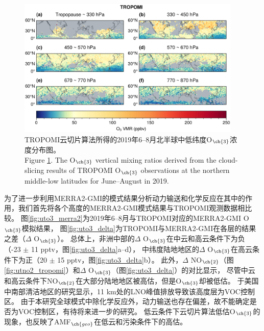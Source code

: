 \begin{figure}[H]
    \centering
    \includegraphics[width=0.95\textwidth]{./figures/uto3_tropomi.png}
    \caption{
    TROPOMI云切片算法所得的2019年6--8月北半球中低纬度O$_{\ch{3}}$浓度分布图。 \\
    Figure \ref{fig:uto3_tropomi}. The O$_{\ch{3}}$ vertical mixing ratios derived from the cloud-slicing results of TROPOMI O$_{\ch{3}}$ observations at the northern middle-low latitudes for June--August in 2019.
    }
    \label{fig:uto3_tropomi}
\end{figure}

为了进一步利用MERRA2-GMI的模式结果分析动力输送和化学反应在其中的作用，我们首先将各个高度的MERRA2-GMI模式结果与TROPOMI观测数据相比较。
图\ref{fig:uto3_merra2}为2019年6--8月与TROPOMI对应的MERRA2-GMI O$_{\ch{3}}$模拟结果，
图\ref{fig:uto3_delta}为TROPOMI与MERRA2-GMI在各层的结果之差（$\Delta$ O$_{\ch{3}}$）。
总体上，非洲中部的$\Delta$ O$_{\ch{3}}$在中云和高云条件下为负（-23 $\pm$ 11 pptv，图\ref{fig:uto3_delta}a--d），
中纬度陆地地区的$\Delta$ O$_{\ch{3}}$在高云条件下为正（20 $\pm$ 15 pptv，图\ref{fig:uto3_delta}b）。
此外，$\Delta$ NO$_{\ch{2}}$（图\ref{fig:utno2_tropomi}）和$\Delta$ O$_{\ch{3}}$（图\ref{fig:uto3_delta}）的对比显示，
尽管中云和高云条件下NO$_{\ch{2}}$在大部分陆地地区被高估，但是O$_{\ch{3}}$却被低估。
\citet{Pickering.1990}于美国中南部清洁地区的研究显示，11 km处的LNO峰值排放导致该高度层为VOC控制区。
由于本研究全球模式中除化学反应外，动力输送也存在偏差，故不能确定是否为VOC控制区，有待将来进一步的研究。
低云条件下云切片算法低估O$_{\ch{3}}$的现象，也反映了AMF$_{\ch{geo}}$在低云和污染条件下的高估\citep{BelmonteRivas.2015}。


